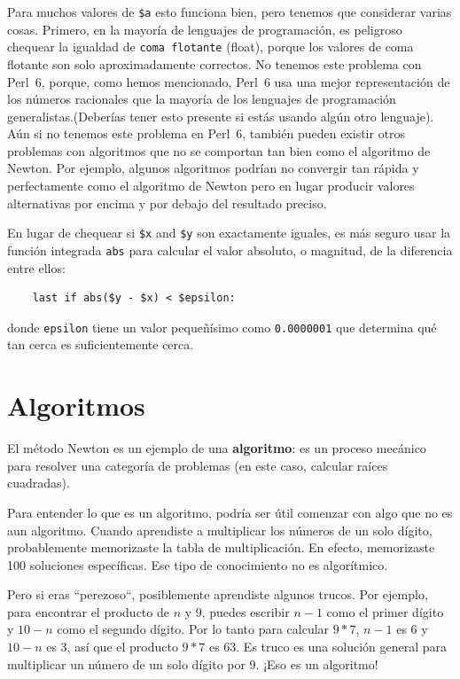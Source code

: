 Para muchos valores de {\tt \$a} esto funciona bien,
pero tenemos que considerar varias cosas.
Primero, en la mayoría de lenguajes de programación, es peligroso
chequear la igualdad de {\tt coma flotante} (float), porque
los valores de coma flotante son solo aproximadamente correctos.
No tenemos este problema con Perl~6, porque, como hemos mencionado, 
Perl~6 usa una mejor representación de los números racionales que la mayoría
de los lenguajes de programación generalistas.(Deberías tener esto
presente si estás usando algún otro lenguaje). Aún si no tenemos este problema
en Perl~6, también pueden existir otros problemas con algoritmos que no se
comportan tan bien como el algoritmo de Newton. Por ejemplo, 
algunos algoritmos podrían no convergir tan rápida y perfectamente como
el algoritmo de Newton pero en lugar producir valores
alternativas por encima y por debajo del resultado preciso.

En lugar de chequear si {\tt \$x} and {\tt \$y} son exactamente iguales,
es más seguro usar la función integrada {\tt abs} para calcular el 
valor absoluto, o magnitud, de la diferencia entre ellos:

\begin{verbatim}
    last if abs($y - $x) < $epsilon:
\end{verbatim}
%
donde \verb"epsilon" tiene un valor pequeñísimo como {\tt 0.0000001} 
que determina qué tan cerca es suficientemente cerca.



\section{Algoritmos}

El método Newton es un ejemplo de una {\bf algoritmo}: es un proceso
mecánico para resolver una categoría de problemas (en este caso,
calcular raíces cuadradas).

Para entender lo que es un algoritmo, podría ser útil comenzar con algo que no 
es aun algoritmo. Cuando aprendiste a multiplicar los números de un solo dígito, 
probablemente memorizaste la tabla de multiplicación. En efecto, 
memorizaste 100 soluciones específicas. Ese tipo de conocimiento no
es algorítmico.

Pero si eras ``perezoso``, posiblemente aprendiste algunos 
trucos. Por ejemplo, para encontrar el producto de $n$ y 9,
puedes escribir $n-1$ como el primer dígito y $10-n$ como el 
segundo dígito. Por lo tanto para calcular $9*7$, $n-1$ es 6 y
$10-n$ es 3, así que el producto $9*7$ es 63. Es truco es una 
solución general para multiplicar un número de un solo 
dígito por 9. ¡Eso es un algoritmo!

